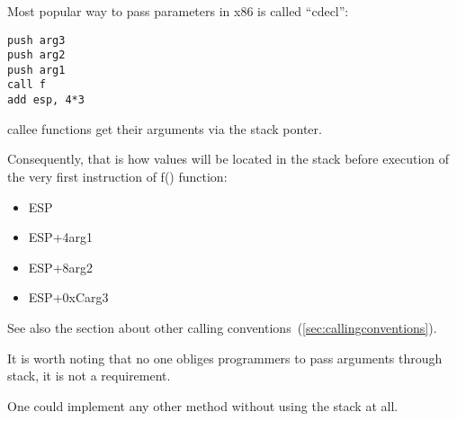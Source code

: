 ﻿\subsubsection{}

{Most popular way to pass parameters in x86 is called} ``cdecl'':

\begin{lstlisting}
push arg3
push arg2
push arg1
call f
add esp, 4*3
\end{lstlisting}

{\Gls{callee} functions get their arguments via the stack ponter.}

{Consequently, that is how values will be located in the stack before execution
of the very first instruction of f() function:}

\begin{itemize}
\item ESP\EMDASH{}
\item ESP+4\EMDASH{}arg1
\item ESP+8\EMDASH{}arg2
\item ESP+0xC\EMDASH{}arg3
\end{itemize}

{See also the section about other calling conventions}~(\ref{sec:callingconventions}).

{It is worth noting that no one obliges programmers to pass arguments through stack, it is not a requirement.}

{One could implement any other method without using the stack at all.}

